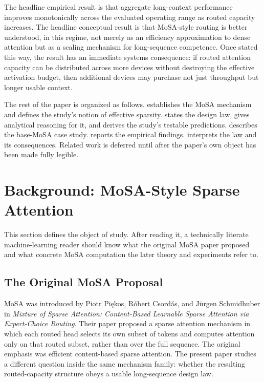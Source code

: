 \documentclass[11pt]{article}
\begin{document}
The headline empirical result is that aggregate long-context performance improves monotonically across the evaluated operating range as routed capacity increases. The headline conceptual result is that MoSA-style routing is better understood, in this regime, not merely as an efficiency approximation to dense attention but as a scaling mechanism for long-sequence competence. Once stated this way, the result has an immediate systems consequence: if routed attention capacity can be distributed across more devices without destroying the effective activation budget, then additional devices may purchase not just throughput but longer usable context.

The rest of the paper is organized as follows.  establishes the MoSA mechanism and defines the study's notion of effective sparsity.  states the design law, gives analytical reasoning for it, and derives the study's testable predictions.  describes the base-MoSA case study.  reports the empirical findings.  interprets the law and its consequences. Related work is deferred until after the paper's own object has been made fully legible.


\section{Background: MoSA-Style Sparse Attention}
\label{sec:background}

This section defines the object of study. After reading it, a technically literate machine-learning reader should know what the original MoSA paper proposed and what concrete MoSA computation the later theory and experiments refer to.

\subsection{The Original MoSA Proposal}

MoSA was introduced by Piotr Pi\k{e}kos, R\'obert Csord\'as, and J\"urgen Schmidhuber in \emph{Mixture of Sparse Attention: Content-Based Learnable Sparse Attention via Expert-Choice Routing}. Their paper proposed a sparse attention mechanism in which each routed head selects its own subset of tokens and computes attention only on that routed subset, rather than over the full sequence. The original emphasis was efficient content-based sparse attention. The present paper studies a different question inside the same mechanism family: whether the resulting routed-capacity structure obeys a usable long-sequence design law.
\end{document}
